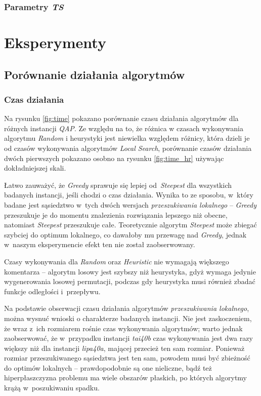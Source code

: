 \documentclass{article}
\begin{document}
		\subsubsection{Parametry \emph{TS}}
\section{Eksperymenty}
	\subsection{Porównanie działania algorytmów}
		\subsubsection{Czas działania}


			Na rysunku \ref{fig:time} pokazano porównanie czasu działania algorytmów dla różnych instancji \emph{QAP}. Ze względu na to, że różnica w czasach wykonywania algorytmu \emph{Random} i heurystyki jest niewielka względem różnicy, która dzieli je od czasów wykonywania algorytmów \emph{Local Search}, porównanie czasów działania dwóch pierwszych pokazano osobno na rysunku \ref{fig:time_hr} używając dokładniejszej skali.


			Łatwo zauważyć, że \emph{Greedy} sprawuje się lepiej od~\emph{Steepest} dla wszystkich badanych instancji, jeśli chodzi o czas działania. Wynika to ze sposobu, w~który badane jest sąsiedztwo w~tych dwóch wersjach \emph{przeszukiwania lokalnego} -- \emph{Greedy} przeszukuje je do momentu znalezienia rozwiązania lepszego niż obecne, natomiast \emph{Steepest} przeszukuje całe. Teoretycznie algorytm \emph{Steepest} może zbiegać szybciej do optimum lokalnego, co dawałoby mu przewagę nad \emph{Greedy}, jednak w~naszym eksperymencie efekt ten nie został zaobserwowany.


			Czasy wykonywania dla \emph{Random} oraz \emph{Heuristic} nie wymagają większego komentarza -- algorytm losowy jest szybszy niż heurystyka, gdyż wymaga jedynie wygenerowania losowej permutacji, podczas gdy heurystyka musi również zbadać funkcje odległości i~przepływu.


			Na podstawie obserwacji czasu działania algorytmów \emph{przeszukiwania lokalnego}, można wysnuć wnioski o charakterze badanych instancji. Nie jest zaskoczeniem, że wraz z~ich rozmiarem rośnie czas wykonywania algorytmów; warto jednak zaobserwować, że w~przypadku instancji \emph{tai40b} czas wykonywania jest dwa razy większy niż dla instancji \emph{lipa40a}, mającej przecież ten sam rozmiar. Ponieważ rozmiar przeszukiwanego sąsiedztwa jest ten sam, powodem musi być zbieżność do optimów lokalnych -- prawdopodobnie są one nieliczne, bądź też hiperpłaszczyzna problemu ma wiele obszarów płaskich, po których algorytmy krążą w~poszukiwaniu spadku.
\end{document}
